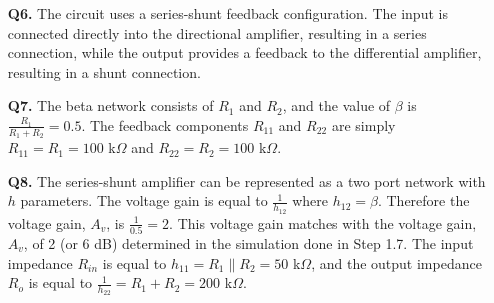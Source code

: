 \documentclass[12pt]{article}
\begin{document}
\begin{itemize}
\begin{enumerate}
    \end{enumerate}
    \item [\textbf{Q6.}]
    The circuit uses a series-shunt feedback configuration. The input is connected directly into the directional amplifier, resulting in a series connection, while the output provides a feedback to the differential amplifier, resulting in a shunt connection.
    \item [\textbf{Q7.}]
    The beta network consists of $R_1$ and $R_2$, and the value of $\beta$ is $\frac{R_1}{R_1+R_2} = 0.5$. The feedback components $R_{11}$ and $R_{22}$ are simply $R_{11} = R_1 = 100$ k$\Omega$ and $R_{22} = R_2 = 100$ k$\Omega$. 
    \item [\textbf{Q8.}]
    The series-shunt amplifier can be represented as a two port network with $h$ parameters. The voltage gain is equal to $\frac{1}{h_{12}}$ where $h_{12} = \beta$. Therefore the voltage gain, $A_v$, is $\frac{1}{0.5} = 2$. This voltage gain matches with the voltage gain, $A_v$, of 2 (or 6 dB) determined in the simulation done in Step 1.7. The input impedance $R_{in}$ is equal to $h_{11} = R_1 \parallel R_2 = 50$ k$\Omega$, and the output impedance $R_{o}$ is equal to $\frac{1}{h_{22}} = R_1 + R_2 = 200$ k$\Omega$.

    \clearpage

\end{itemize}
\end{document}
